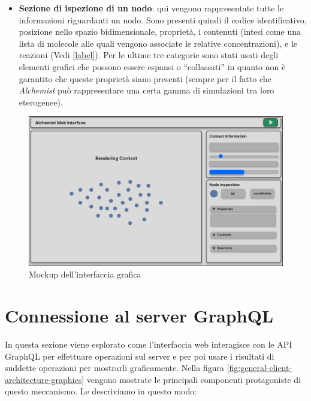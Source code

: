 \begin{itemize}
	\item \textbf{Sezione di ispezione di un nodo}: qui vengono rappresentate tutte le informazioni riguardanti un nodo. Sono presenti quindi il codice identificativo, posizione nello spazio bidimensionale, proprietà, i contenuti (intesi come una lista di molecole alle quali vengono associate le relative concentrazioni), e le reazioni (Vedi \ref{label}). Per le ultime tre categorie sono stati usati degli elementi grafici che possono essere espansi o ``collassati'' in quanto non è garantito che queste proprietà siano presenti (sempre per il fatto che \textit{Alchemist} può rappresentare una certa gamma di simulazioni tra loro eterogenee).
\end{itemize}

\begin{figure}[htb]
	\centering
	\includegraphics[scale=0.65]{imgs/Interface_Layout.pdf}
	\caption{Mockup dell'interfaccia grafica}
	\label{fig:interface-layout}
\end{figure}

\section{Connessione al server GraphQL}
In questa sezione viene esplorato come l'interfaccia web interagisce con le \ac{API} GraphQL per effettuare operazioni sul server e per poi usare i risultati di suddette operazioni per mostrarli graficamente. Nella figura \ref{fig:general-client-architecture-graphics} vengono mostrate le principali componenti protagoniste di questo meccanismo. Le descriviamo in questo modo:

